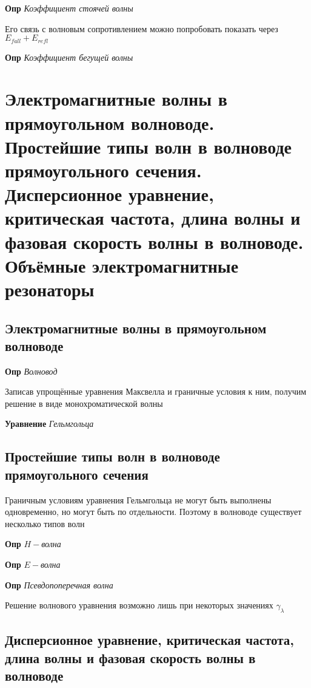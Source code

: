 \documentclass[a4paper, 14pt]{article}
\begin{document}
    \textbf{Опр} \textit{Коэффициент стоячей волны}
    
    Его связь с волновым сопротивлением можно попробовать показать через $E_{fall} + E_{refl}$
    
    \textbf{Опр} \textit{Коэффициент бегущей волны}
    
    \section{Электромагнитные волны в прямоугольном волноводе.
    Простейшие типы волн в волноводе прямоугольного сечения.
    Дисперсионное уравнение, критическая частота, длина волны и фазовая скорость волны в волноводе.
    Объёмные электромагнитные резонаторы}
    
    \subsection{Электромагнитные волны в прямоугольном волноводе}
    
    \textbf{Опр} \textit{Волновод}
    
    Записав упрощённые уравнения Максвелла и граничные условия к ним, получим решение в виде монохроматической волны
    
    \textbf{Уравнение} \textit{Гельмгольца}
    
    \subsection{Простейшие типы волн в волноводе прямоугольного сечения}
    
    Граничным условиям уравнения Гельмгольца не могут быть выполнены одновременно, но могут быть по отдельности.
    Поэтому в волноводе существует несколько типов волн
    
    \textbf{Опр} \textit{$H-$волна}
    
    \textbf{Опр} \textit{$E-$волна}
    
    \textbf{Опр} \textit{Псевдопоперечная волна}
    
    Решение волнового уравнения возможно лишь при некоторых значениях $\gamma_\lambda$
    
    \subsection{Дисперсионное уравнение, критическая частота, длина волны и фазовая скорость волны в волноводе}
    
\end{document}
